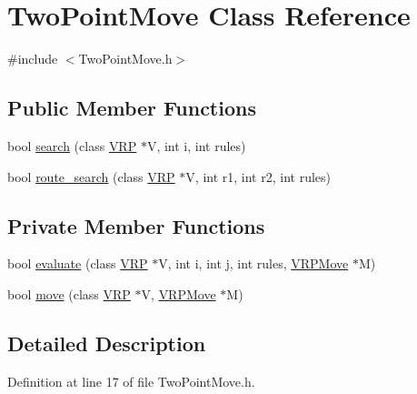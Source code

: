 \hypertarget{class_two_point_move}{
\section{TwoPointMove Class Reference}
\label{class_two_point_move}
}


{\ttfamily \#include $<$TwoPointMove.h$>$}

\subsection*{Public Member Functions}
\begin{DoxyCompactItemize}
\item 
bool \hyperlink{class_two_point_move_a684f431858dfaf6cf3627dcc6ac8cab1}{search} (class \hyperlink{class_v_r_p}{VRP} $\ast$V, int i, int rules)
\item 
bool \hyperlink{class_two_point_move_a8ce6bf19877c6bd9d995916dabbf91c6}{route\_\-search} (class \hyperlink{class_v_r_p}{VRP} $\ast$V, int r1, int r2, int rules)
\end{DoxyCompactItemize}
\subsection*{Private Member Functions}
\begin{DoxyCompactItemize}
\item 
bool \hyperlink{class_two_point_move_a5351a828422a8bb9bdd6da038eafcb7d}{evaluate} (class \hyperlink{class_v_r_p}{VRP} $\ast$V, int i, int j, int rules, \hyperlink{class_v_r_p_move}{VRPMove} $\ast$M)
\item 
bool \hyperlink{class_two_point_move_a8de77664807eafbb8c457cb57bd64faf}{move} (class \hyperlink{class_v_r_p}{VRP} $\ast$V, \hyperlink{class_v_r_p_move}{VRPMove} $\ast$M)
\end{DoxyCompactItemize}


\subsection{Detailed Description}


Definition at line 17 of file TwoPointMove.h.



